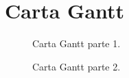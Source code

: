 \section{Carta Gantt}
\label{ap:Z1}


\begin{figure}[H]
	\centering
	\caption{Carta Gantt parte 1.}
	\label{fig:gantt1}
\end{figure}

\begin{figure}[H]
	\centering
	\caption{Carta Gantt parte 2.}
	\label{fig:gantt2}
\end{figure}




